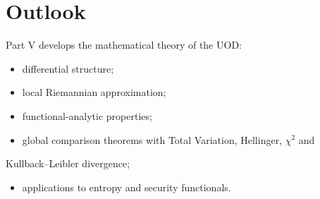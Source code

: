 \section{Outlook}
Part V develops the mathematical theory of the UOD:
\begin{itemize}
  \item differential structure;
  \item local Riemannian approximation;
  \item functional-analytic properties;
  \item global comparison theorems with Total Variation, Hellinger, $\chi^2$ and
\end{itemize}
    Kullback--Leibler divergence;
\begin{itemize}
  \item applications to entropy and security functionals.
\end{itemize}
